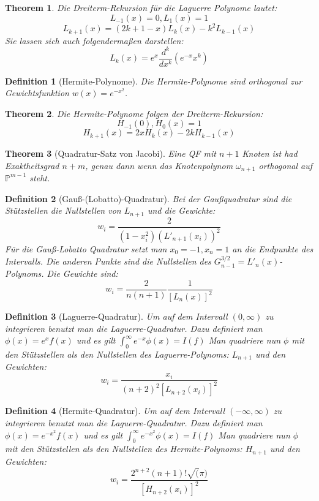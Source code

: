 \documentclass[10pt,a4paper]{article}
\newtheorem{theorem}{Theorem}
\newtheorem{definition}{Definition}
\begin{document}
	\begin{theorem}
		Die Dreiterm-Rekursion für die Laguerre Polynome lautet:
		$$L_{-1}(x)=0, L_1(x)= 1$$
		$$L_{k+1}(x) = (2k+1-x)L_k(x) - k^2L_{k-1}(x)$$
		Sie lassen sich auch folgendermaßen darstellen:
		$$L_k(x)= e^x\frac{d^k}{dx^k}(e^{-x}x^k)$$
	\end{theorem}
	\begin{definition}[Hermite-Polynome]
		Die Hermite-Polynome sind orthogonal zur Gewichtsfunktion $w(x) = e^{-x^2}$.
	\end{definition}
	\begin{theorem}
		Die Hermite-Polynome folgen der Dreiterm-Rekursion:
		$$H_{-1}(0), H_0(x)=1$$
		$$H_{k+1}(x)=2xH_k(x)-2kH_{k-1}(x)$$
	\end{theorem}
	\begin{theorem}[Quadratur-Satz von Jacobi]
		Eine QF mit $n+1$ Knoten ist had Exaktheitsgrad $n+m$, genau dann wenn das Knotenpolynom $\omega_{n+1}$ orthogonal auf $\mathbb{P}^{m-1}$ steht.
	\end{theorem}
	\begin{definition}[Gauß-(Lobatto)-Quadratur]
		Bei der Gaußquadratur sind die Stützstellen die Nullstellen von $L_{n+1}$ und die Gewichte:
		$$w_i = \frac{2}{(1-x_i^2)(L'_{n+1}(x_i))^2}$$
		Für die Gauß-Lobatto Quadratur setzt man $x_0=-1, x_n=1$ an die Endpunkte des Intervalls. Die anderen Punkte sind die Nullstellen des $G_{n-1}^{3/2}= L'_n(x)$-Polynoms.
		Die Gewichte sind:
		$$w_i=\frac{2}{n(n+1)}\frac{1}{[L_n(x)]^2}$$
	\end{definition}
	\begin{definition}[Laguerre-Quadratur]
		Um auf dem Intervall $(0, \infty)$ zu integrieren benutzt man die Laguerre-Quadratur. Dazu definiert man $\phi(x) = e^x f(x)$ und es gilt $\int_0^\infty e^{-x}\phi(x) = I(f)$
		Man quadriere nun $\phi$ mit den Stützstellen als den Nullstellen des Laguerre-Polynoms: $L_{n+1}$ und den Gewichten:
		 $$w_i = \frac{x_i}{(n+2)^2[L_{n+2}(x_i)]^2}$$
	\end{definition}
	\begin{definition}[Hermite-Quadratur]
		Um auf dem Intervall $(-\infty, \infty)$ zu integrieren benutzt man die Laguerre-Quadratur. Dazu definiert man $\phi(x) = e^{-x^2} f(x)$ und es gilt $\int_0^\infty e^{-x^2}\phi(x) = I(f)$
		Man quadriere nun $\phi$ mit den Stützstellen als den Nullstellen des Hermite-Polynoms: $H_{n+1}$ und den Gewichten:
		 $$w_i = \frac{2^{n+2}(n+1)!\sqrt(\pi)}{[H_{n+2}(x_i)]^2}$$
	\end{definition}
\end{document}
